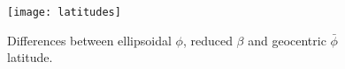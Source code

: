 \begin{figure}
  \centering
  \texttt{[image: latitudes]}
  \caption{Differences between ellipsoidal $\phi$, reduced $\beta$ and geocentric $\bar{\phi}$ latitude.}
  \label{fig:latitude-diffs}
\end{figure}

